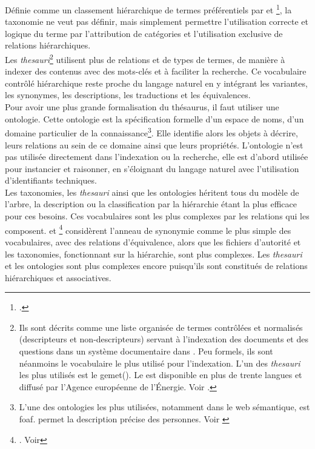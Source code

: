 Définie comme un \og classement hiérarchique de termes préférentiels\fg{} par  et \footcite{rosenfeld_information_2015}, la taxonomie ne veut pas définir, mais simplement permettre l'utilisation correcte et logique du terme par l'attribution de catégories et l'utilisation exclusive de relations hiérarchiques.\\

Les \textit{thesauri}\footnote{Ils sont décrits comme une \og liste organisée de termes contrôlées et normalisés (descripteurs et non-descripteurs) servant à l’indexation des documents et des questions dans un système documentaire\fg{} dans \cite{degez_thesauroglossaire_2001}. Peu formels, ils sont néanmoins le vocabulaire le plus utilisé pour l'indexation. L'un des \textit{thesauri} les plus utilisés est le \ac{gemet}(\cite{noauthor_general_nodate}). Le  est disponible en plus de trente langues et diffusé par l'Agence européenne de l'Énergie. Voir .} utilisent plus de relations et de types de termes, de manière à indexer des contenus avec des mots-clés et à faciliter la recherche. Ce vocabulaire contrôlé hiérarchique reste proche du langage naturel en y intégrant les variantes, les synonymes, les descriptions, les traductions et les équivalences.\\

Pour avoir une plus grande formalisation du thésaurus, il faut utiliser une ontologie. Cette ontologie est la spécification formelle d'un espace de noms, d'un domaine particulier de la connaissance\footnote{L'une des ontologies les plus utilisées, notamment dans le web sémantique, est \ac{foaf}.  permet la description précise des personnes. Voir \cite{noauthor_foaf_nodate}}. Elle identifie alors les objets à décrire, leurs relations au sein de ce domaine ainsi que leurs propriétés. L'ontologie n'est pas utilisée directement dans l'indexation ou la recherche, elle est d'abord utilisée pour instancier et raisonner, en s'éloignant du langage naturel avec l'utilisation d'identifiants techniques.\\

Les taxonomies, les \textit{thesauri} ainsi que les ontologies héritent tous du modèle de l'arbre, la description ou la classification par la hiérarchie étant la plus efficace pour ces besoins. Ces vocabulaires sont les plus complexes par les relations qui les composent.  et \footnote{\cite{rosenfeld_information_2015}. Voir } considèrent l'anneau de synonymie comme le plus simple des vocabulaires, avec des relations d'équivalence, alors que les fichiers d'autorité et les taxonomies, fonctionnant sur la hiérarchie, sont plus complexes. Les \textit{thesauri} et les ontologies sont plus complexes encore puisqu'ils sont constitués de relations hiérarchiques et associatives.

